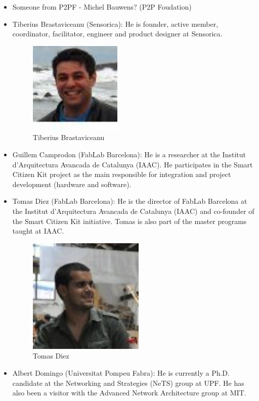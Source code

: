 \documentclass[oneside]{book}   %
\begin{document}
\begin{itemize}
\item Someone from P2PF - Michel Bauwens? (P2P Foudation)
\item Tiberius Brastaviceanu (Sensorica): He is founder, active member, coordinator, facilitator, engineer and product designer at Sensorica.
\begin{figure}
\begin{center}
\includegraphics[width=0.125\linewidth]{Tiberius}
\caption{Tiberius Brastaviceanu}
\end{center}
\end{figure}
\item Guillem Camprodon (FabLab Barcelona): He is a researcher at the Institut d'Arquitectura Avancada de Catalunya (IAAC). He participates in the Smart Citizen Kit project as the main responsible for integration and project development (hardware and software).
\item Tomas Diez (FabLab Barcelona): He is the director of FabLab Barcelona at the Institut d'Arquitectura Avancada de Catalunya (IAAC) and co-founder of the Smart Citizen Kit initiative. Tomas is also part of the master programs taught at IAAC.
\begin{figure}
\begin{center}
\includegraphics[width=0.125\linewidth]{tomas}
\caption{Tomas Diez}
\end{center}
\end{figure}
\item Albert Domingo (Universitat Pompeu Fabra):
He is currently a Ph.D. candidate at the Networking and Strategies (NeTS) group at UPF. He has also been a visitor with the Advanced Network Architecture group at MIT.


\end{itemize}
\end{document}
